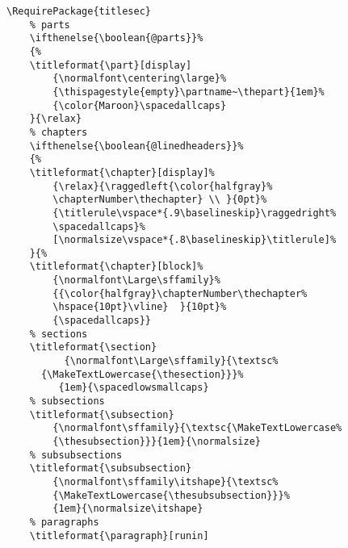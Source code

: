\begin{lstlisting}
\RequirePackage{titlesec}
	% parts
	\ifthenelse{\boolean{@parts}}%
	{%
    \titleformat{\part}[display]
        {\normalfont\centering\large}%
        {\thispagestyle{empty}\partname~\thepart}{1em}%
        {\color{Maroon}\spacedallcaps}
    }{\relax}
    % chapters
    \ifthenelse{\boolean{@linedheaders}}%
    {%
    \titleformat{\chapter}[display]%             
        {\relax}{\raggedleft{\color{halfgray}%
        \chapterNumber\thechapter} \\ }{0pt}%
        {\titlerule\vspace*{.9\baselineskip}\raggedright%
        \spacedallcaps}%
        [\normalsize\vspace*{.8\baselineskip}\titlerule]%
    }{%  
    \titleformat{\chapter}[block]%
        {\normalfont\Large\sffamily}%
        {{\color{halfgray}\chapterNumber\thechapter%
        \hspace{10pt}\vline}  }{10pt}%
        {\spacedallcaps}}
    % sections
    \titleformat{\section} 
    	  {\normalfont\Large\sffamily}{\textsc%
	  {\MakeTextLowercase{\thesection}}}%
         {1em}{\spacedlowsmallcaps}
    % subsections
    \titleformat{\subsection}
        {\normalfont\sffamily}{\textsc{\MakeTextLowercase%
        {\thesubsection}}}{1em}{\normalsize}
    % subsubsections
    \titleformat{\subsubsection}
        {\normalfont\sffamily\itshape}{\textsc%
        {\MakeTextLowercase{\thesubsubsection}}}%
        {1em}{\normalsize\itshape}        
    % paragraphs
    \titleformat{\paragraph}[runin]

\end{lstlisting}
